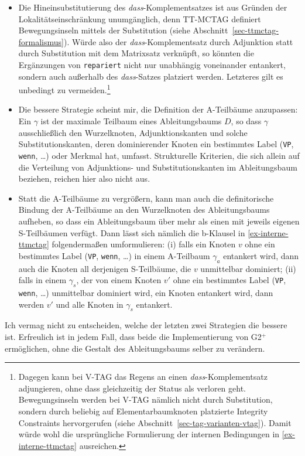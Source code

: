 \begin{itemize}
  \item Die Hineinsubstitutierung des {\it dass}-Komplementsatzes ist aus Gründen der Lokalitätseinschränkung unumgänglich, denn TT-MCTAG definiert Bewegungsinseln mittels der Substitution (siehe Abschnitt~\ref{sec-ttmctag-formalismus}). Würde also der {\it dass}-Komplementsatz durch Adjunktion statt durch Substitution mit dem Matrixsatz verknüpft, so könnten die Ergänzungen von {\tt repariert} nicht nur unabhängig voneinander entankert, sondern auch au\ss erhalb des {\it dass}-Satzes platziert werden. Letzteres gilt es unbedingt zu vermeiden.\footnote{Dagegen kann bei V-TAG das Regens an einen {\it dass}-Komplementsatz adjungieren, ohne dass gleichzeitig der Status als  verloren geht. Bewegungsinseln werden bei V-TAG nämlich nicht durch Substitution, sondern durch beliebig auf Elementarbaumknoten platzierte Integrity Constraints hervorgerufen (siehe Abschnitt~\ref{sec-tag-varianten-vtag}). Damit würde wohl die ursprüngliche Formulierung der internen Bedingungen in \ref{ex-interne-ttmctag} ausreichen.}
  \item Die bessere Strategie scheint mir, die Definition der A-Teilbäume anzupassen: Ein  $\gamma$ ist der maximale Teilbaum eines Ableitungsbaums $D$, so dass $\gamma$ ausschlie\ss lich den Wurzelknoten, Adjunktionskanten und solche Substitutionskanten, deren dominierender Knoten ein bestimmtes Label ({\tt VP}, {\tt wenn}, \ldots) oder Merkmal hat, umfasst. Strukturelle Kriterien, die sich allein auf die Verteilung von Adjunktions- und Substitutionskanten im Ableitungsbaum beziehen, reichen hier also nicht aus.%
  \item Statt die A-Teilbäume zu vergrö\ss ern, kann man auch die definitorische Bindung der A-Teilbäume an den Wurzelknoten des Ableitungsbaums aufheben, so dass ein Ableitungsbaum über mehr als einen  mit jeweils eigenen S-Teilbäumen verfügt. Dann lässt sich nämlich die b-Klausel in \ref{ex-interne-ttmctag} folgenderma\ss en umformulieren: (i) falls ein Knoten $v$ ohne ein bestimmtes Label ({\tt VP}, {\tt wenn}, \ldots) in einem A-Teilbaum $\gamma_a$ entankert wird, dann auch die Knoten all derjenigen S-Teilbäume, die $v$ unmittelbar dominiert; (ii) falls in einem  $\gamma_s$, der von einem Knoten $v'$ ohne ein bestimmtes Label ({\tt VP}, {\tt wenn}, \ldots) unmittelbar dominiert wird, ein Knoten entankert wird, dann werden $v'$ und alle Knoten in $\gamma_s$ entankert.  
\end{itemize} 
\newpage
Ich vermag nicht zu entscheiden, welche der letzten zwei Strategien die bessere ist. Erfreulich ist in jedem Fall, dass beide die Implementierung von G2$^+$ ermöglichen, ohne die Gestalt des Ableitungsbaums selber zu verändern. 

